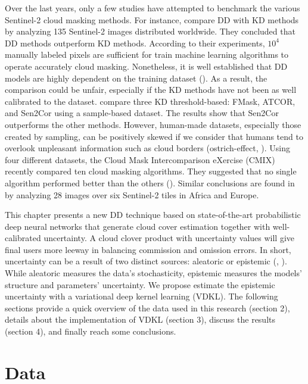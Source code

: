 \documentclass[a4paper, nobind]{templates/cdethesis}
\begin{document}
Over the last years, only a few studies have attempted to benchmark the various Sentinel-2 cloud masking methods. For instance, \cite{Cilli} compare DD with KD methods by analyzing 135 Sentinel-2 images distributed worldwide. They concluded that DD methods outperform KD methods. According to their experiments, \(10^{4}\) manually labeled pixels are sufficient for train machine learning algorithms to operate accurately cloud masking. Nonetheless, it is well established that DD models are highly dependent on the training dataset (\cite{Lopez-Puigdollers2021}). As a result, the comparison could be unfair, especially if the KD methods have not been as well calibrated to the dataset. \cite{Zekoll2021} compare three KD threshold-based: FMask, ATCOR, and Sen2Cor using a sample-based dataset. The results show that Sen2Cor outperforms the other methods. However, human-made datasets, especially those created by sampling, can be positively skewed if we consider that humans tend to overlook unpleasant information such as cloud borders (ostrich-effect, \cite{Valdez2017}). Using four different datasets, the Cloud Mask Intercomparison eXercise (CMIX) recently compared ten cloud masking algorithms. They suggested that no single algorithm performed better than the others (\cite{CMIXRSE22}). Similar conclusions are found in \cite{tarrio2020comparison} by analyzing 28 images over six Sentinel-2 tiles in Africa and Europe.

This chapter presents a new DD technique based on state-of-the-art probabilistic deep neural networks that generate cloud cover estimation together with well-calibrated uncertainty. A cloud clover product with uncertainty values will give final users more leeway in balancing commission and omission errors. In short, uncertainty can be a result of two distinct sources: aleatoric or epistemic (\cite{hora1996aleatory}, \cite{der2009aleatory}). While aleatoric measures the data's stochasticity, epistemic measures the models' structure and parameters' uncertainty. We propose estimate the epistemic uncertainty with a variational deep kernel learning (VDKL). The following sections provide a quick overview of the data used in this research (section 2), details about the implementation of VDKL (section 3), discuss the results (section 4), and finally reach some conclusions.

\hypertarget{data}{%
\section{Data}\label{data}}
\end{document}
